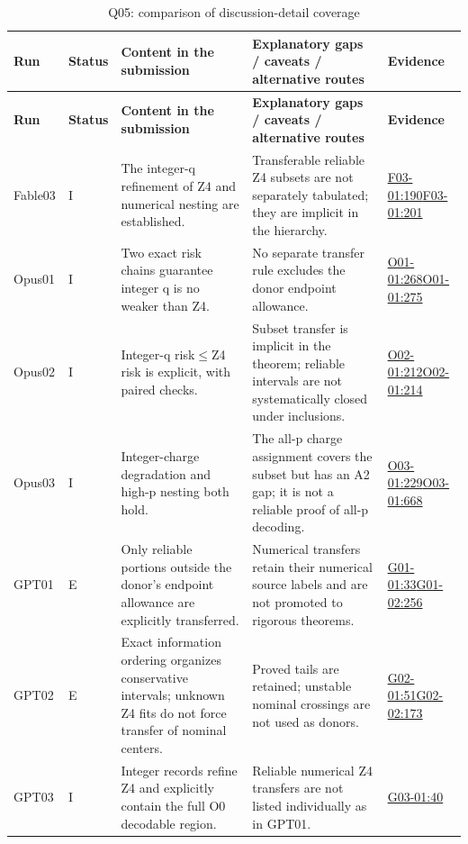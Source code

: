 \documentclass[11pt,a4paper]{article}
\begin{document}
{\fontsize{9.0}{12.6}\selectfont
\setlength{\tabcolsep}{2.5pt}
\begin{longtable}{>{\raggedright\arraybackslash}p{}>{\raggedright\arraybackslash}p{}>{\raggedright\arraybackslash}p{}>{\raggedright\arraybackslash}p{}>{\raggedright\arraybackslash}p{}}
\caption{Q05: comparison of discussion-detail coverage}\\
\toprule
\textbf{Run} & \textbf{Status} & \textbf{Content in the submission} & \textbf{Explanatory gaps /\allowbreak{} caveats /\allowbreak{} alternative routes} & \textbf{Evidence}\tabularnewline
\midrule
\endfirsthead
\toprule
\textbf{Run} & \textbf{Status} & \textbf{Content in the submission} & \textbf{Explanatory gaps /\allowbreak{} caveats /\allowbreak{} alternative routes} & \textbf{Evidence}\tabularnewline
\midrule
\endhead
{}Fable03 & I & The integer-q refinement of Z4 and numerical nesting are established. & Transferable reliable Z4 subsets are not separately tabulated; they are implicit in the hierarchy. & \hyperref[src:F03-01]{F03-01:190}\newline \hyperref[src:F03-01]{F03-01:201}\tabularnewline
{}Opus01 & I & Two exact risk chains guarantee integer q is no weaker than Z4. & No separate transfer rule excludes the donor endpoint allowance. & \hyperref[src:O01-01]{O01-01:268}\newline \hyperref[src:O01-01]{O01-01:275}\tabularnewline
{}Opus02 & I & Integer-q risk\ensuremath{\leq}Z4 risk is explicit,\allowbreak{} with paired checks. & Subset transfer is implicit in the theorem; reliable intervals are not systematically closed under inclusions. & \hyperref[src:O02-01]{O02-01:212}\newline \hyperref[src:O02-01]{O02-01:214}\tabularnewline
{}Opus03 & I & Integer-charge degradation and high-p nesting both hold. & The all-p charge assignment covers the subset but has an A2 gap; it is not a reliable proof of all-p decoding. & \hyperref[src:O03-01]{O03-01:229}\newline \hyperref[src:O03-01]{O03-01:668}\tabularnewline
{}GPT01 & E & Only reliable portions outside the donor’s endpoint allowance are explicitly transferred. & Numerical transfers retain their numerical source labels and are not promoted to rigorous theorems. & \hyperref[src:G01-01]{G01-01:33}\newline \hyperref[src:G01-02]{G01-02:256}\tabularnewline
{}GPT02 & E & Exact information ordering organizes conservative intervals; unknown Z4 fits do not force transfer of nominal centers. & Proved tails are retained; unstable nominal crossings are not used as donors. & \hyperref[src:G02-01]{G02-01:51}\newline \hyperref[src:G02-02]{G02-02:173}\tabularnewline
{}GPT03 & I & Integer records refine Z4 and explicitly contain the full O0 decodable region. & Reliable numerical Z4 transfers are not listed individually as in GPT01. & \hyperref[src:G03-01]{G03-01:40}\tabularnewline
\bottomrule
\end{longtable}
}
\end{document}
